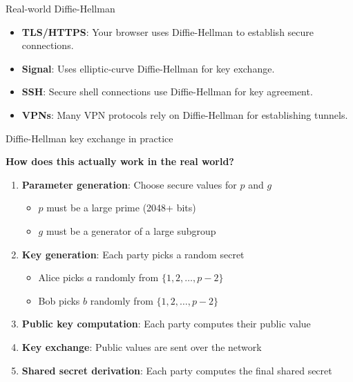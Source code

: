 \ifdefined\PRESENTATION\else\PassOptionsToClass{handout}{beamer}\fi\documentclass[aspectratio=169, lualatex]{beamer}
\begin{document}
\begin{frame}{Real-world Diffie-Hellman}
	\begin{itemize}[<+->]
		\item \textbf{TLS/HTTPS}: Your browser uses Diffie-Hellman to establish secure connections.
		\item \textbf{Signal}: Uses elliptic-curve Diffie-Hellman for key exchange.
		\item \textbf{SSH}: Secure shell connections use Diffie-Hellman for key agreement.
		\item \textbf{VPNs}: Many VPN protocols rely on Diffie-Hellman for establishing tunnels.
	\end{itemize}
	\vspace{0.5cm}
\end{frame}

\begin{frame}{Diffie-Hellman key exchange in practice}
	\begin{center}
		\Large\textbf{How does this actually work in the real world?}
	\end{center}
	\vspace{0.5cm}
	\begin{enumerate}[<+->]
		\item \textbf{Parameter generation}: Choose secure values for $p$ and $g$
		      \begin{itemize}
			      \item $p$ must be a large prime (2048+ bits)
			      \item $g$ must be a generator of a large subgroup
		      \end{itemize}
		\item \textbf{Key generation}: Each party picks a random secret
		      \begin{itemize}
			      \item Alice picks $a$ randomly from $\{1, 2, \ldots, p-2\}$
			      \item Bob picks $b$ randomly from $\{1, 2, \ldots, p-2\}$
		      \end{itemize}
		\item \textbf{Public key computation}: Each party computes their public value
		\item \textbf{Key exchange}: Public values are sent over the network
		\item \textbf{Shared secret derivation}: Each party computes the final shared secret
	\end{enumerate}
\end{frame}
\end{document}
